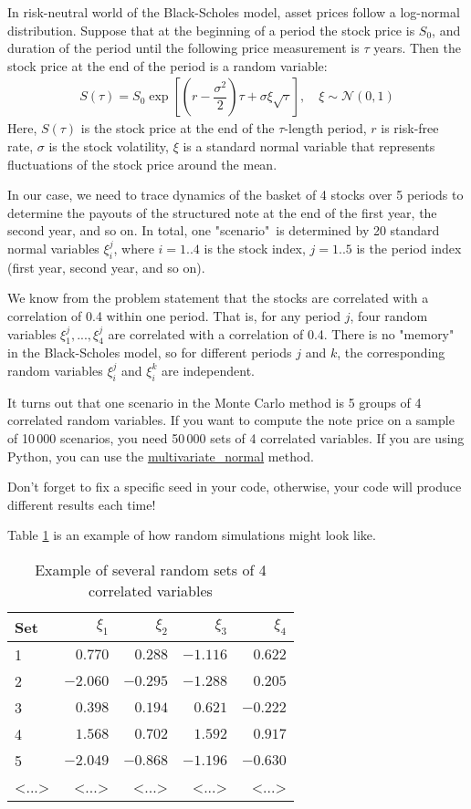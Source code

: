 \documentclass[a4paper,14pt]{extarticle}
\begin{document}
In risk-neutral world of the Black-Scholes model, asset prices follow a log-normal distribution. Suppose that at the beginning of a period the stock price is $S_0$, and duration of the period until the following price measurement is $\tau$ years. Then the stock price at the end of the period is a random variable:
\begin{align}
S(\tau) = S_0\exp\left[\left(r - \dfrac{\sigma^2}{2}\right)\tau +
\sigma\xi\sqrt{\tau}\right], \quad \xi \sim \mathcal{N}(0, 1)
\label{brownian_final_price}
\end{align}
Here, $S(\tau)$ is the stock price at the end of the $\tau$-length period, $r$ is risk-free rate, $\sigma$ is the stock volatility, $\xi$ is a standard normal variable that represents fluctuations of the stock price around the mean.

In our case, we need to trace dynamics of the basket of 4 stocks over 5 periods to determine the payouts of the structured note at the end of the first year, the second year, and so on. In total, one "scenario"\ is determined by 20 standard normal variables $\xi_i^j$, where $i=1..4$ is the stock index, $j=1..5$ is the period index (first year, second year, and so on).

We know from the problem statement that the stocks are correlated with a correlation of 0.4 within one period. That is, for any period $j$, four random variables $\xi_1^j,..., \xi_4^j$ are correlated with a correlation of 0.4. There is no "memory" in the Black-Scholes model, so for different periods $j$ and $k$, the corresponding random variables $\xi_i^j$ and $\xi_i^k$ are independent.

It turns out that one scenario in the Monte Carlo method is 5 groups of 4 correlated random variables. If you want to compute the note price on a sample of 10\,000 scenarios, you need 50\,000 sets of 4 correlated variables. If you are using Python, you can use the \href{https://numpy.org/doc/stable/reference/random/generated/numpy.random.Generator.multivariate_normal.html}{multivariate\_normal} method.

Don't forget to fix a specific seed in your code, otherwise, your code will produce different results each time!

Table \ref{random_sample_table} is an example of how random simulations might look like.
\begin{table}[h]
\centering
\begin{tabular}{l|r|r|r|r}
Set & $\xi_1$ & $\xi_2$ & $\xi_3$ & $\xi_4$ \\ \hline
1 & $0.770$ &  $0.288$ & $-1.116$ &  $0.622$ \\
2 &$-2.060$ & $-0.295$ & $-1.288$ &  $0.205$ \\
3 & $0.398$ &  $0.194$ &  $0.621$ & $-0.222$ \\
4 & $1.568$ &  $0.702$ &  $1.592$ &  $0.917$ \\
5 &$-2.049$ & $-0.868$ & $-1.196$ & $-0.630$ \\
<...> & <...> & <...> & <...> & <...>
\end{tabular}
\caption{Example of several random sets of 4 correlated variables}
\label{random_sample_table}
\end{table}
\end{document}
